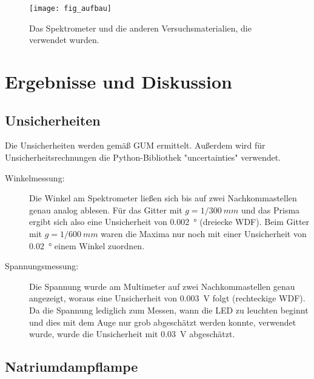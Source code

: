 \documentclass[
	a4paper,
	12pt,
	pagesize,
	ngerman
]{scrartcl}
\begin{document}
	\begin{figure}[H] 
		\texttt{[image: fig\_aufbau]}
		\centering
		\caption{Das Spektrometer und die anderen Versuchsmaterialien, die verwendet wurden. \cite{Aufbau}}
		\label{fig_aufbau}
		\centering
	\end{figure}

	\section{Ergebnisse und Diskussion}
	
	
	\subsection{Unsicherheiten} %
	Die Unsicherheiten werden gemäß GUM ermittelt. 
	Außerdem wird für Unsicherheitsrechnungen die Python-Bibliothek "uncertainties" verwendet.
	\begin{description}
		\item[Winkelmessung:] Die Winkel am Spektrometer ließen sich bis auf zwei Nachkommastellen genau analog ablesen. %
		Für das Gitter mit $g=1/\SI{300}{mm}$ und das Prisma ergibt sich also eine Unsicherheit von \SI{0,002}{\degree} (dreiecke WDF). %
		Beim Gitter mit $g=1/\SI{600}{mm}$ waren die Maxima nur noch mit einer Unsicherheit von \SI{0,02}{\degree} einem Winkel zuordnen. %
		\item[Spannungsmessung:] Die Spannung wurde am Multimeter auf zwei Nachkommastellen genau angezeigt, woraus eine Unsicherheit von \SI{0,003}{V} folgt (rechteckige WDF).
		Da die Spannung lediglich zum Messen, wann die LED zu leuchten beginnt und dies mit dem Auge nur grob abgeschätzt werden konnte, verwendet wurde, wurde die Unsicherheit mit \SI{0,03}{V} abgeschätzt. %
	\end{description}
	
	\subsection{Natriumdampflampe}
\end{document}
